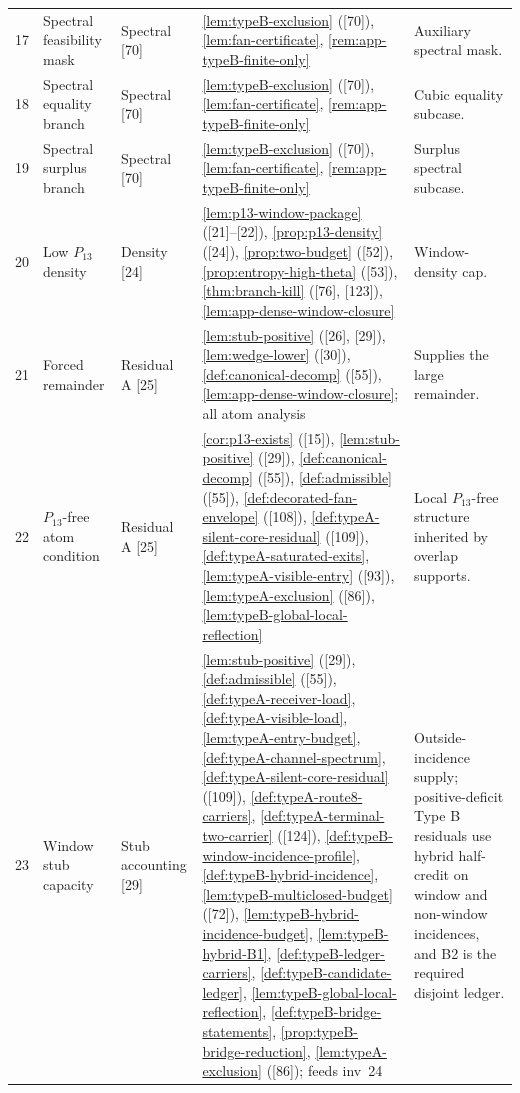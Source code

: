 \documentclass[11pt]{article}
\begin{document}
{\begin{longtable}{C{0.032\textwidth} L{0.145\textwidth} L{0.105\textwidth} L{0.50\textwidth} L{0.155\textwidth}}
17 & Spectral feasibility mask & Spectral {[70]} & \cref{lem:typeB-exclusion} ([70]), \cref{lem:fan-certificate}, \cref{rem:app-typeB-finite-only} & Auxiliary spectral mask. \\
18 & Spectral equality branch & Spectral {[70]} & \cref{lem:typeB-exclusion} ([70]), \cref{lem:fan-certificate}, \cref{rem:app-typeB-finite-only} & Cubic equality subcase. \\
19 & Spectral surplus branch & Spectral {[70]} & \cref{lem:typeB-exclusion} ([70]), \cref{lem:fan-certificate}, \cref{rem:app-typeB-finite-only} & Surplus spectral subcase. \\
20 & Low $P_{13}$ density & Density {[24]} & \cref{lem:p13-window-package} ([21]--[22]), \cref{prop:p13-density} ([24]), \cref{prop:two-budget} ([52]), \cref{prop:entropy-high-theta} ([53]), \cref{thm:branch-kill} ([76], [123]), \cref{lem:app-dense-window-closure} & Window-density cap. \\
21 & Forced remainder & Residual A {[25]} & \cref{lem:stub-positive} ([26], [29]), \cref{lem:wedge-lower} ([30]), \cref{def:canonical-decomp} ([55]), \cref{lem:app-dense-window-closure}; all atom analysis & Supplies the large remainder. \\
22 & $P_{13}$-free atom condition & Residual A {[25]} & \cref{cor:p13-exists} ([15]), \cref{lem:stub-positive} ([29]), \cref{def:canonical-decomp} ([55]), \cref{def:admissible} ([55]), \cref{def:decorated-fan-envelope} ([108]), \cref{def:typeA-silent-core-residual} ([109]), \cref{def:typeA-saturated-exits}, \cref{lem:typeA-visible-entry} ([93]), \cref{lem:typeA-exclusion} ([86]), \cref{lem:typeB-global-local-reflection} & Local $P_{13}$-free structure inherited by overlap supports. \\
23 & Window stub capacity & Stub accounting {[29]} & \cref{lem:stub-positive} ([29]), \cref{def:admissible} ([55]), \cref{def:typeA-receiver-load}, \cref{def:typeA-visible-load}, \cref{lem:typeA-entry-budget}, \cref{def:typeA-channel-spectrum}, \cref{def:typeA-silent-core-residual} ([109]), \cref{def:typeA-route8-carriers}, \cref{def:typeA-terminal-two-carrier} ([124]), \cref{def:typeB-window-incidence-profile}, \cref{def:typeB-hybrid-incidence}, \cref{lem:typeB-multiclosed-budget} ([72]), \cref{lem:typeB-hybrid-incidence-budget}, \cref{lem:typeB-hybrid-B1}, \cref{def:typeB-ledger-carriers}, \cref{def:typeB-candidate-ledger}, \cref{lem:typeB-global-local-reflection}, \cref{def:typeB-bridge-statements}, \cref{prop:typeB-bridge-reduction}, \cref{lem:typeA-exclusion} ([86]); feeds inv~24 & Outside-incidence supply; positive-deficit Type B residuals use hybrid half-credit on window and non-window incidences, and B2 is the required disjoint ledger. \\

\end{longtable}}
\end{document}
